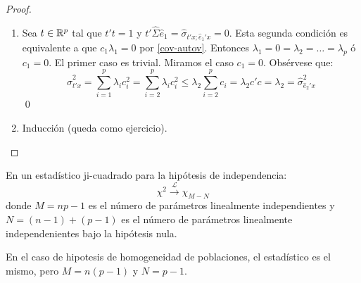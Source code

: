 \documentclass[twoside]{article}
\begin{document}
\begin{proof}
\begin{enumerate}
\item Sea $t \in \mathbb{R}^p$ tal que $t't=1$ y $t' \hat{\Sigma}\hat{e}_1 = \hat{\sigma}_{t'x;\hat{e}_1'x}=0$. Esta segunda condición es equivalente a que $c_1 \lambda_1 = 0$ por \eqref{cov-autov}.
Entonces $\lambda_1 = 0 = \lambda_2 = \dots = \lambda_p$ ó $c_1 = 0$.
El primer caso es trivial. Miramos el caso $c_1 = 0$.
Obsérvese que:
\[ \hat{\sigma}_{t'x}^2 = \sum_{i=1}^p \lambda_i c_i^2 = \sum_{i=2}^p \lambda_i c_i^2 \leq \lambda_2 \sum_{i=2}^p c_i = \lambda_2 c'c = \lambda_2 = \hat{\sigma}_{\hat{e}_2'x}^2\]
\qed

\item Inducción (queda como ejercicio).
\end{enumerate}
\end{proof}

\begin{nota}[Tema 6]
En un estadístico ji-cuadrado para la hipótesis de independencia:
\[ \chi^2 \xrightarrow{\mathcal{L}} \chi_{M-N} \]
donde $M = np-1$ es el número de parámetros linealmente independientes y $N = (n-1) + (p-1)$ es el número de parámetros linealmente independenientes bajo la hipótesis nula.

En el caso de hipotesis de homogeneidad de poblaciones, el estadístico es el mismo, pero $M = n(p-1)$ y $N=p-1$.
\end{nota}
\end{document}
